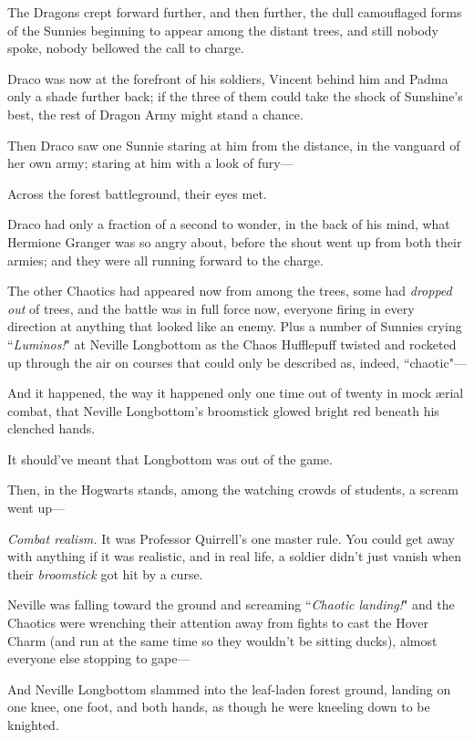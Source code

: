The Dragons crept forward further, and then further, the dull camouflaged forms of the Sunnies beginning to appear among the distant trees, and still nobody spoke, nobody bellowed the call to charge.

Draco was now at the forefront of his soldiers, Vincent behind him and Padma only a shade further back; if the three of them could take the shock of Sunshine's best, the rest of Dragon Army might stand a chance.

Then Draco saw one Sunnie staring at him from the distance, in the vanguard of her own army; staring at him with a look of fury—

Across the forest battleground, their eyes met.

Draco had only a fraction of a second to wonder, in the back of his mind, what Hermione Granger was so angry about, before the shout went up from both their armies; and they were all running forward to the charge.

\later

The other Chaotics had appeared now from among the trees, some had \emph{dropped out} of trees, and the battle was in full force now, everyone firing in every direction at anything that looked like an enemy. Plus a number of Sunnies crying ``\emph{Luminos!}" at Neville Longbottom as the Chaos Hufflepuff twisted and rocketed up through the air on courses that could only be described as, indeed, ``chaotic"—

And it happened, the way it happened only one time out of twenty in mock ærial combat, that Neville Longbottom's broomstick glowed bright red beneath his clenched hands.

It should've meant that Longbottom was out of the game.

Then, in the Hogwarts stands, among the watching crowds of students, a scream went up—

\emph{Combat realism.} It was Professor Quirrell's one master rule. You could get away with anything if it was realistic, and in real life, a soldier didn't just vanish when their \emph{broomstick} got hit by a curse.

Neville was falling toward the ground and screaming ``\emph{Chaotic landing!}" and the Chaotics were wrenching their attention away from fights to cast the Hover Charm (and run at the same time so they wouldn't be sitting ducks), almost everyone else stopping to gape—

And Neville Longbottom slammed into the leaf-laden forest ground, landing on one knee, one foot, and both hands, as though he were kneeling down to be knighted.

